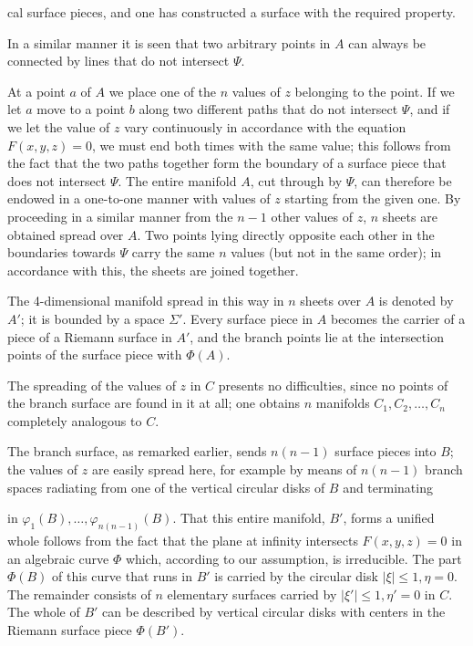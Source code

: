 \documentclass{article}
\begin{document}
cal surface pieces, and one has constructed a surface with the required property.

In a similar manner it is seen that two arbitrary points in $A$ can always be connected by lines that do not intersect $\Psi$.

At a point $a$ of $A$ we place one of the $n$ values of $z$ belonging to the point. If we let $a$ move to a point $b$ along two different paths that do not intersect $\Psi$, and if we let the value of $z$ vary continuously in accordance with the equation $F(x, y, z) = 0$, we must end both times with the same value; this follows from the fact that the two paths together form the boundary of a surface piece that does not intersect $\Psi$. The entire manifold $A$, cut through by $\Psi$, can therefore be endowed in a one-to-one manner with values of $z$ starting from the given one. By proceeding in a similar manner from the $n - 1$ other values of $z$, $n$ sheets are obtained spread over $A$. Two points lying directly opposite each other in the boundaries towards $\Psi$ carry the same $n$ values (but not in the same order); in accordance with this, the sheets are joined together.

The 4-dimensional manifold spread in this way in $n$ sheets over $A$ is denoted by $A'$; it is bounded by a space $\Sigma'$. Every surface piece in $A$ becomes the carrier of a piece of a Riemann surface in $A'$, and the branch points lie at the intersection points of the surface piece with $\Phi(A)$.

The spreading of the values of $z$ in $C$ presents no difficulties, since no points of the branch surface are found in it at all; one obtains $n$ manifolds $C_1, C_2, \dots, C_n$ completely analogous to $C$.

The branch surface, as remarked earlier, sends $n(n - 1)$ surface pieces into $B$; the values of $z$ are easily spread here, for example by means of $n(n - 1)$ branch spaces radiating from one of the vertical circular disks of $B$ and terminating

in $\varphi_1(B), \dots, \varphi_{n(n-1)}(B)$. That this entire manifold, $B'$, forms a unified whole follows from the fact that the plane at infinity intersects $F(x, y, z) = 0$ in an algebraic curve $\Phi$ which, according to our assumption, is irreducible. The part $\Phi(B)$ of this curve that runs in $B'$ is carried by the circular disk $|\xi| \le 1, \eta = 0$. The remainder consists of $n$ elementary surfaces carried by $|\xi'| \le 1, \eta' = 0$ in $C$. The whole of $B'$ can be described by vertical circular disks with centers in the Riemann surface piece $\Phi(B')$.
\end{document}
